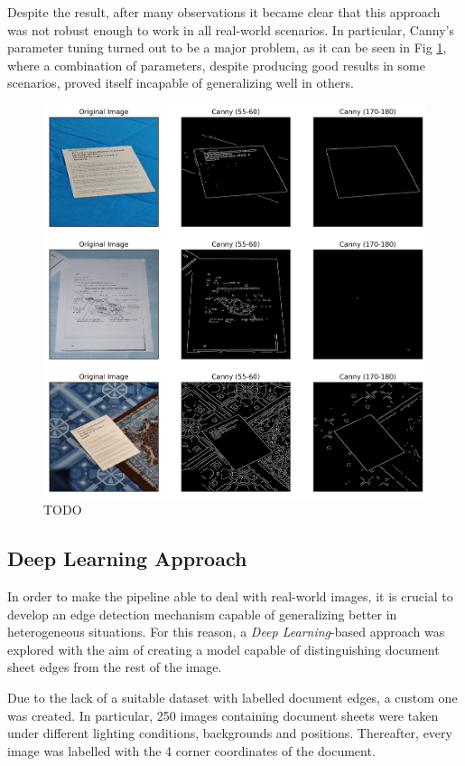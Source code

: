 \documentclass[]{article}
\begin{document}
Despite the result, after many observations it became clear that this approach was not robust enough to
work in all real-world scenarios. In particular, Canny's parameter tuning turned out to be a major
problem, as it can be seen in Fig \ref{fig:canny_comparison}, where a combination of parameters,
despite producing good results in some scenarios, proved itself incapable of generalizing well in others.

\begin{figure}[htb!]
	\includegraphics[width=\linewidth]{canny_comparison.png}
	\caption{TODO}
	\label{fig:canny_comparison}
\end{figure}

\subsection{Deep Learning Approach}

In order to make the pipeline able to deal with real-world images, it is crucial to develop an
edge detection mechanism capable of generalizing better in heterogeneous situations. 
For this reason, a \textit{Deep Learning}-based approach was explored with the aim of creating a model
capable of distinguishing document sheet edges from the rest of the image.

Due to the lack of a suitable dataset with labelled document edges, a custom one was created.
In particular, 250 images containing document sheets were taken under different lighting conditions, 
backgrounds and positions. Thereafter, every image was labelled with the 4 corner coordinates of the document.
\end{document}
